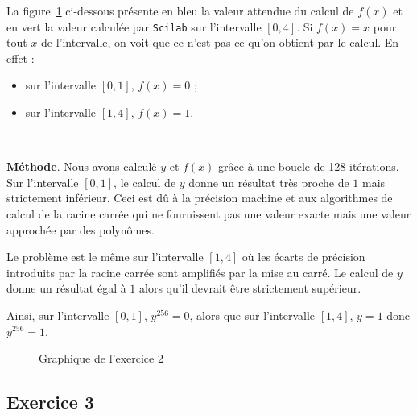 \documentclass[a4paper,11pt]{article}
\theoremstyle{nonumberplain}
\theoremstyle{nonumberplain}
\theoremstyle{nonumberplain}
\begin{document}
    La figure~\ref{graph_exo2} ci-dessous présente en bleu la valeur attendue du calcul de $f(x)$ et en vert la valeur calculée par \texttt{Scilab} sur l'intervalle $[0, 4]$.
    Si $f(x) = x$ pour tout $x$ de l'intervalle, on voit que ce n'est pas ce qu'on obtient par le calcul. En effet :

    \begin{itemize}
        \item sur l'intervalle $[0, 1]$, $f(x) = 0$ ;
        \item sur l'intervalle $[1, 4]$, $f(x) = 1$.
    \end{itemize}~\newline

    \textbf{Méthode}. Nous avons calculé $y$ et $f(x)$ grâce à une boucle de 128 itérations.
    Sur l'intervalle $[0, 1]$, le calcul de $y$ donne un résultat très proche de $1$ mais strictement inférieur. Ceci est dû à la précision machine
    et aux algorithmes de calcul de la racine carrée qui ne fournissent pas une valeur exacte mais une valeur approchée par des polynômes.

    Le problème est le même sur l'intervalle $[1, 4]$ où les écarts de précision introduits par la racine carrée sont amplifiés par la mise au carré. Le calcul de $y$ donne
    un résultat égal à $1$ alors qu'il devrait être strictement supérieur.

    Ainsi, sur l'intervalle $[0, 1]$, $y^{256} = 0$, alors que sur l'intervalle $[1, 4]$, $y = 1$ donc $y^{256} = 1$.

    \begin{figure}
        \centering
        \caption{\label{graph_exo2} Graphique de l'exercice 2}
    \end{figure}


\subsection*{Exercice 3}
\end{document}
